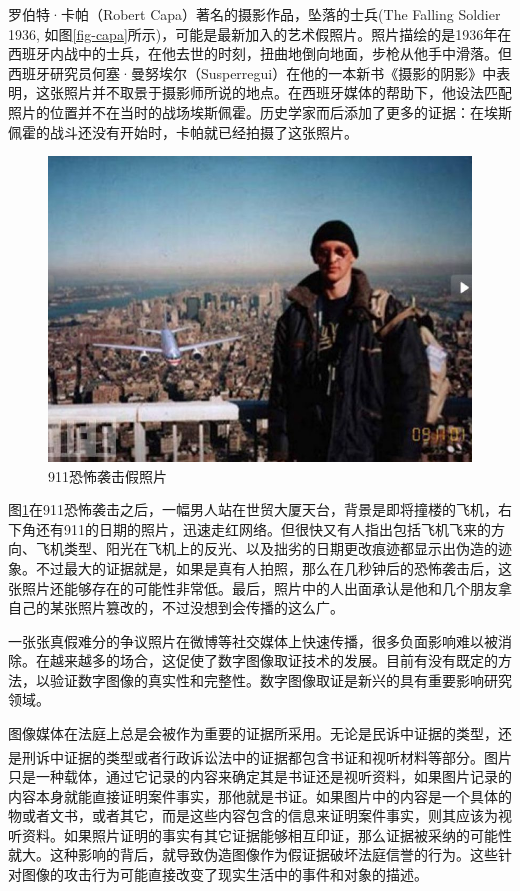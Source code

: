 \documentclass[a4paper, 10pt, notitlepage]{report}
\newcommand{\supercite}[1]{\textsuperscript{\cite{#1}}}
\begin{document}
		罗伯特·卡帕（Robert Capa）著名的摄影作品，坠落的士兵(The Falling Soldier 1936, 如图\ref{fig-capa}所示)，可能是最新加入的艺术假照片。照片描绘的是1936年在西班牙内战中的士兵，在他去世的时刻，扭曲地倒向地面，步枪从他手中滑落。但西班牙研究员何塞·曼努埃尔（Susperregui）在他的一本新书《摄影的阴影》中表明，这张照片并不取景于摄影师所说的地点。在西班牙媒体的帮助下，他设法匹配照片的位置并不在当时的战场埃斯佩霍。历史学家而后添加了更多的证据：在埃斯佩霍的战斗还没有开始时，卡帕就已经拍摄了这张照片。

		\begin{figure}[htp]
			\centering
			\includegraphics[width=5in]{img/19025168_3.jpeg}
			\caption{911恐怖袭击假照片}
			\label{fig-911}
		\end{figure}

		图\ref{fig-911}在911恐怖袭击之后，一幅男人站在世贸大厦天台，背景是即将撞楼的飞机，右下角还有911的日期的照片，迅速走红网络。但很快又有人指出包括飞机飞来的方向、飞机类型、阳光在飞机上的反光、以及拙劣的日期更改痕迹都显示出伪造的迹象。不过最大的证据就是，如果是真有人拍照，那么在几秒钟后的恐怖袭击后，这张照片还能够存在的可能性非常低。最后，照片中的人出面承认是他和几个朋友拿自己的某张照片篡改的，不过没想到会传播的这么广。

		一张张真假难分的争议照片在微博等社交媒体上快速传播，很多负面影响难以被消除。在越来越多的场合，这促使了数字图像取证技术的发展。目前有没有既定的方法，以验证数字图像的真实性和完整性。数字图像取证是新兴的具有重要影响研究领域。

		图像媒体在法庭上总是会被作为重要的证据所采用。无论是民诉中证据的类型，还是刑诉中证据的类型或者行政诉讼法中的证据都包含书证和视听材料等部分\supercite{魏振瀛2007民法}。图片只是一种载体，通过它记录的内容来确定其是书证还是视听资料，如果图片记录的内容本身就能直接证明案件事实，那他就是书证。如果图片中的内容是一个具体的物或者文书，或者其它，而是这些内容包含的信息来证明案件事实，则其应该为视听资料。如果照片证明的事实有其它证据能够相互印证，那么证据被采纳的可能性就大。这种影响的背后，就导致伪造图像作为假证据破坏法庭信誉的行为。这些针对图像的攻击行为可能直接改变了现实生活中的事件和对象的描述。
\end{document}
